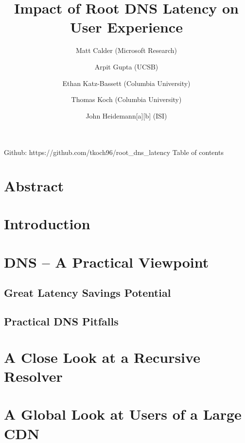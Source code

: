 \documentclass[sigconf,nonacm,10pt]{acmart}
\title{Impact of Root DNS Latency on User Experience}
\author{
            Matt Calder (Microsoft Research)
         \and 
            Arpit Gupta (UCSB)
         \and 
            Ethan Katz-Bassett (Columbia University)
         \and 
            Thomas Koch (Columbia University)
         \and 
            John Heidemann{[}a{]}{[}b{]} (ISI)
        }
\date{}
\begin{document}
\maketitle

\iffalse

Github: https://github.com/tkoch96/root\_dns\_latency Table of contents

\section*{Abstract}\label{abstract}

\section{Introduction}\label{introduction}

\section{DNS -- A Practical Viewpoint}\label{dns-a-practical-viewpoint}

\subsection{Great Latency Savings
Potential}\label{great-latency-savings-potential}

\subsection{Practical DNS Pitfalls}\label{practical-dns-pitfalls}

\section{A Close Look at a Recursive
Resolver}\label{a-close-look-at-a-recursive-resolver}

\section{A Global Look at Users of a Large
CDN}\label{a-global-look-at-users-of-a-large-cdn}
\end{document}

